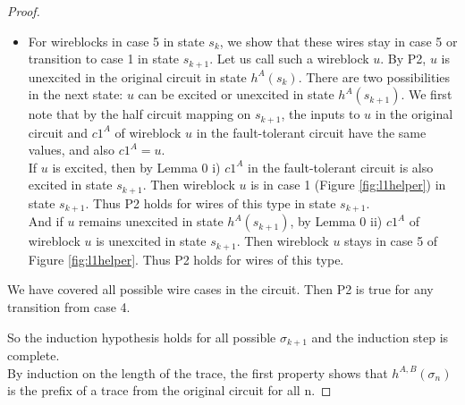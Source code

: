 \documentclass[12pt]{report}
\begin{document}
\begin{proof}
\begin{itemize}
\begin{itemize}
\item
For wireblocks in case 5 in state $s_k$, we show that these wires stay in case 5 or transition to case 1 in state $s_{k+1}$.  Let us call such a wireblock $u$.  By P2, $u$ is unexcited in the original circuit in state $h^A(s_{k})$.  There are two possibilities in the next state: $u$ can be excited or unexcited in state $h^A(s_{k+1})$.  We first note that by the half circuit mapping on $s_{k+1}$, the inputs to $u$ in the original circuit and $c1^A$ of wireblock $u$ in the fault-tolerant circuit have the same values, and also $c1^A=u$.  \\
If $u$ is excited, then by Lemma 0 i) $c1^A$ in the fault-tolerant circuit is also excited in state $s_{k+1}$.  Then wireblock $u$ is in case 1 (Figure \ref{fig:l1helper}) in state $s_{k+1}$.  Thus P2 holds for wires of this type in state $s_{k+1}$.\\
And if $u$ remains unexcited in state $h^A(s_{k+1})$, by Lemma 0 ii) $c1^A$ of wireblock $u$ is unexcited in state $s_{k+1}$.  Then wireblock $u$ stays in case 5 of Figure \ref{fig:l1helper}.  Thus P2 holds for wires of this type.
\end{itemize}
We have covered all possible wire cases in the circuit.   
Then P2 is true for any transition from case 4. 
\end{itemize}
So the induction hypothesis holds for all possible $\sigma_{k+1}$ and the induction step is complete. \\
By induction on the length of the trace, the first property shows that $h^{A,B}(\sigma_n)$ is the prefix of a trace from the original circuit for all n.


\end{proof}
\end{document}
